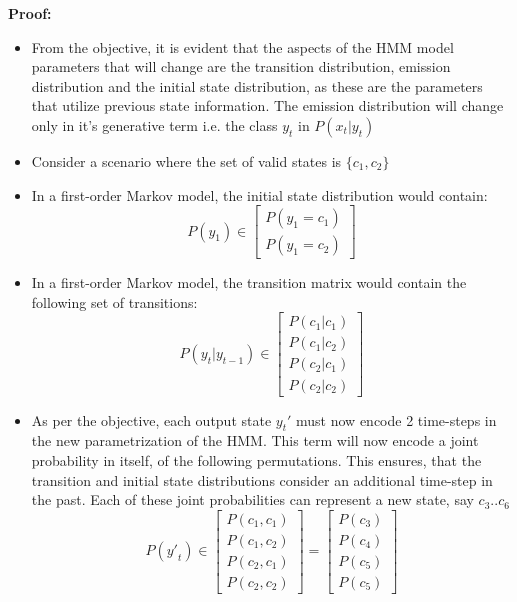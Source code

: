 \documentclass[parskip=half]{scrartcl}
\begin{document}
        \textbf{Proof:}
        \begin{itemize}
            \item 
            From the objective, it is evident that the aspects of the HMM model parameters that will change are the transition distribution, emission distribution and the initial state distribution, as these are the parameters that utilize previous state information. The emission distribution will change only in it's generative term i.e. the class $y_t$ in $P(x_t|y_t)$
            \item 
            Consider a scenario where the set of valid states is $\{c_1, c_2\}$
            \item 
            In a first-order Markov model, the initial state distribution would contain:
            \begin{equation} \label{eqn:initial_state_dist_original}
                P(y_1) \in \begin{bmatrix} P(y_1 = c_1) \\ P(y_1 = c_2) \end{bmatrix}
            \end{equation}
            \item 
            In a first-order Markov model, the transition matrix would contain the following set of transitions:
            \begin{equation} \label{eqn:transition_matrix_original}
                P(y_t|y_{t-1}) \in \begin{bmatrix} P(c_1|c_1) \\ P(c_1|c_2) \\ P(c_2|c_1) \\ P(c_2|c_2) \end{bmatrix}
            \end{equation}
            \item 
            As per the objective, each output state ${y_t}\prime$ must now encode 2 time-steps in the new parametrization of the HMM. This term will now encode a joint probability in itself, of the following permutations. This ensures, that the transition and initial state distributions consider an additional time-step in the past. Each of these joint probabilities can represent a new state, say $c_3 .. c_6$ 
            $$P({y\prime}_{t}) \in \begin{bmatrix} P(c_1, c_1) \\ P(c_1, c_2) \\ P(c_2, c_1) \\ P(c_2, c_2) \end{bmatrix} = \begin{bmatrix} P(c_3) \\ P(c_4) \\ P(c_5) \\ P(c_5) \end{bmatrix} $$

\end{itemize}
\end{document}
